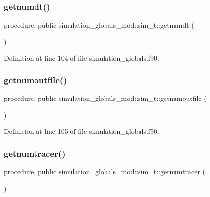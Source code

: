 \subsubsection{\texorpdfstring{getnumdt()}{getnumdt()}}
{\footnotesize\ttfamily procedure, public simulation\+\_\+globals\+\_\+mod\+::sim\+\_\+t\+::getnumdt (\begin{DoxyParamCaption}{ }\end{DoxyParamCaption})}



Definition at line 104 of file simulation\+\_\+globals.\+f90.

\mbox{\label{structsimulation__globals__mod_1_1sim__t_a968cc771ddeefe57addd7391a5bc8aaf}} 
\subsubsection{\texorpdfstring{getnumoutfile()}{getnumoutfile()}}
{\footnotesize\ttfamily procedure, public simulation\+\_\+globals\+\_\+mod\+::sim\+\_\+t\+::getnumoutfile (\begin{DoxyParamCaption}{ }\end{DoxyParamCaption})}



Definition at line 105 of file simulation\+\_\+globals.\+f90.

\mbox{\label{structsimulation__globals__mod_1_1sim__t_a18168855c804f8215039f3b1388435f8}} 
\subsubsection{\texorpdfstring{getnumtracer()}{getnumtracer()}}
{\footnotesize\ttfamily procedure, public simulation\+\_\+globals\+\_\+mod\+::sim\+\_\+t\+::getnumtracer (\begin{DoxyParamCaption}{ }\end{DoxyParamCaption})}



